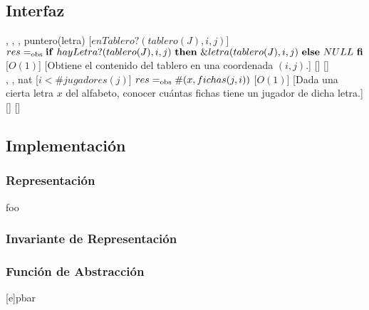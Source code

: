 \begin{interfaz}{\subsection{Interfaz}}
\begin{operaciones}
    \noindent{}
    {
      ,
      ,
      ,
    }{puntero(letra)}
    [$enTablero?(tablero(J),i,j)$]
    {$res\igobs\IFL{hayLetra?(tablero(J),i,j)}THEN{\&letra(tablero(J),i,j)}ELSE{NULL}FI$}
    [$O(1)$]
    [Obtiene el contenido del tablero en una coordenada $(i,j)$.]
    [\falta]
    [\falta]\\

    \noindent{}
    {
      ,
      ,
    }{nat}
    [$i < \#jugadores(j)$]
    {$res=_{\mathrm{obs}} \#(x,fichas(j,i))$}
    [$O(1)$]
    [Dada una cierta letra $x$ del alfabeto, conocer cuántas fichas tiene un jugador de dicha letra.]
    [\falta]
    [\falta]\\

  \end{operaciones}
\end{interfaz}

\subsection{Implementación}
\subsubsection*{Representación}
\begin{Estructura}{foo}
\begin{Tupla}
\end{Tupla}
\end{Estructura}

\subsubsection*{Invariante de Representación}

\par\vspace*{3ex}%

\subsubsection*{Función de Abstracción}
[e]{p}{bar}

